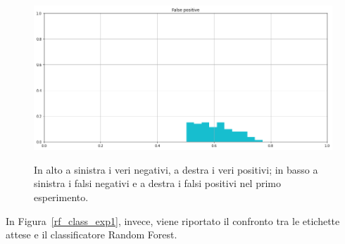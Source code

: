 \documentclass[12pt]{report}
\theoremstyle{definition}
\begin{document}
\begin{figure}
   \begin{minipage}{0.48\textwidth}
     \includegraphics[width=\linewidth]{images/experiment_uniform_disgiunti/fp.png}\label{fp_ud}
   \end{minipage}
   \caption{In alto a sinistra i veri negativi, a destra i veri positivi; in basso a sinistra i falsi negativi e a destra i falsi positivi nel primo esperimento.}
   \label{4cases_exp1}
\end{figure}
 In Figura~\ref{rf_class_exp1}, invece, viene riportato il confronto tra le etichette attese e il classificatore Random Forest.
\end{document}
